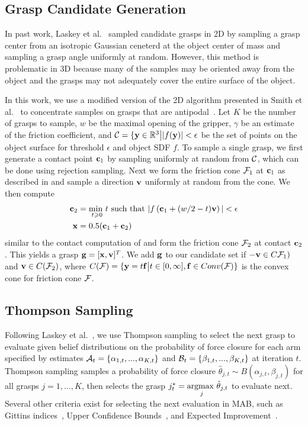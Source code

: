 \subsection{Grasp Candidate Generation}
In past work, Laskey et al.~\cite{laskey2015bandits} sampled candidate grasps in 2D by sampling a grasp center from an isotropic Gaussian ceneterd at the object center of mass and sampling a grasp angle uniformly at random.
However, this method is problematic in 3D because many of the samples may be oriented away from the object and the grasps may not adequately cover the entire surface of the object.

In this work, we use a modified version of the 2D algorithm presented in Smith et al.~\cite{smith1999computing} to concentrate samples on grasps that are antipodal~\cite{mahler2015gp}.
Let $K$ be the number of grasps to sample, $w$ be the maximal opening of the gripper, $\gamma$ be an estimate of the friction coefficient, and $\mathcal{C} = \{ \mathbf{y} \in \mathbb{R}^3 \big| | f(\mathbf{y}) | < \epsilon$ be the set of points on the object surface for threshold $\epsilon$ and object SDF $f$.
To sample a single grasp, we first generate a contact point $\mathbf{c}_1$ by sampling uniformly at random from $\mathcal{C}$, which can be done using rejection sampling.
Next we form the friction cone $\mathcal{F}_1$ at $\mathbf{c}_1$ as described in  and sample a direction $\mathbf{v}$ uniformly at random from the cone.
We then compute
\vspace{-2ex}
\begin{align*}
	\mathbf{c}_2 &= \underset{t \geqslant 0}{\text{min }} t \text{ such that } | f\left(\mathbf{c}_1 + (w / 2 - t) \mathbf{v} \right) | < \epsilon \\
	\mathbf{x} &= 0.5 (\mathbf{c}_1 + \mathbf{c}_2)
\end{align*}
\noindent similar to the contact computation of  and form the friction cone $\mathcal{F}_2$ at contact $\mathbf{c}_2$.
This yields a grasp $\mathbf{g} = [\mathbf{x}, \mathbf{v}]^T$.
We add $\mathbf{g}$ to our candidate set if $-\mathbf{v} \in C\mathcal{F}_1)$ and $\mathbf{v} \in C(\mathcal{F}_2)$, where $C(\mathcal{F}) = \{ \mathbf{y} = t \mathbf{f} \big| t \in [0, \infty], \mathbf{f} \in Conv(\mathcal{F})\}$ is the convex cone for friction cone $\mathcal{F}$.

\subsection{Thompson Sampling}

Following Laskey et al.~\cite{laskey2015bandits}, we use Thompson sampling to select the next grasp to evaluate given belief distributions on the probability of force closure for each arm specified by estimates $\mathcal{A}_t = \{\alpha_{1,t}, ..., \alpha_{K,t}\}$ and $\mathcal{B}_t = \{\beta_{1,t}, ..., \beta_{K,t}\}$ at iteration $t$.
Thompson sampling samples a probability of force closure $\hat{\theta}_{j,t} \sim B(\alpha_{j,t}, \beta_{j,t})$ for all grasps $j = 1, ..., K$, then selects the grasp $j_t^* = \underset{j}{\text{argmax }} \hat{\theta}_{j,t}$ to evaluate next.
Several other criteria exist for selecting the next evaluation in MAB, such as Gittins indices~\cite{laskey2015bandits}, Upper Confidence Bounds~\cite{boularias2015learning}, and Expected Improvement~\cite{montesano2012active}.
 
